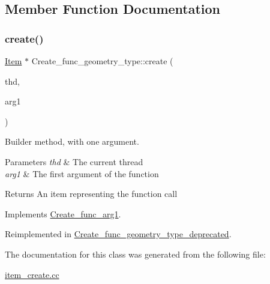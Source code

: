 \subsection{Member Function Documentation}
\mbox{\label{classCreate__func__geometry__type_ae46eece4f49db39b3919df6fcf83752a}} 
\subsubsection{\texorpdfstring{create()}{create()}}
{\footnotesize\ttfamily \mbox{\hyperlink{classItem}{Item}} $\ast$ Create\+\_\+func\+\_\+geometry\+\_\+type\+::create (\begin{DoxyParamCaption}\item[{T\+HD $\ast$}]{thd,  }\item[{\mbox{\hyperlink{classItem}{Item}} $\ast$}]{arg1 }\end{DoxyParamCaption})\hspace{0.3cm}{\ttfamily [virtual]}}

Builder method, with one argument. 
\begin{DoxyParams}{Parameters}
{\em thd} & The current thread \\
\hline
{\em arg1} & The first argument of the function \\
\hline
\end{DoxyParams}
\begin{DoxyReturn}{Returns}
An item representing the function call 
\end{DoxyReturn}


Implements \mbox{\hyperlink{classCreate__func__arg1_a3e9a98f755cd82c3e762e334c955a8c9}{Create\+\_\+func\+\_\+arg1}}.



Reimplemented in \mbox{\hyperlink{classCreate__func__geometry__type__deprecated_a737de32ce101c672a4e5dcdccb3685fe}{Create\+\_\+func\+\_\+geometry\+\_\+type\+\_\+deprecated}}.



The documentation for this class was generated from the following file\+:\begin{DoxyCompactItemize}
\item 
\mbox{\hyperlink{item__create_8cc}{item\+\_\+create.\+cc}}\end{DoxyCompactItemize}
